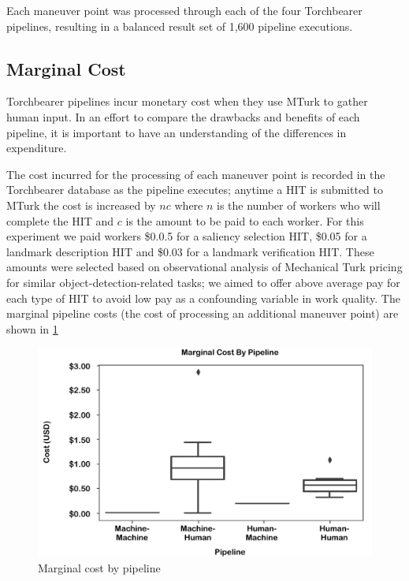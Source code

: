 Each maneuver point was processed through each of the four Torchbearer pipelines, resulting in a balanced result set of 1,600 pipeline executions.

\subsection{Marginal Cost}

Torchbearer pipelines incur monetary cost when they use MTurk to gather human input. In an effort to compare the drawbacks and benefits of each pipeline, it is important to have an understanding of the differences in expenditure.

The cost incurred for the processing of each maneuver point is recorded in the Torchbearer database as the pipeline executes; anytime a HIT is submitted to MTurk the cost is increased by $nc$ where $n$ is the number of workers who will complete the HIT and $c$ is the amount to be paid to each worker. For this experiment we paid workers \$0.0.5 for a saliency selection HIT, \$0.05 for a landmark description HIT and \$0.03 for a landmark verification HIT. These amounts were selected based on observational analysis of Mechanical Turk pricing for similar object-detection-related tasks; we aimed to offer above average pay for each type of HIT to avoid low pay as a confounding variable in work quality. The marginal pipeline costs (the cost of processing an additional maneuver point) are shown in \ref{fig:plot:cost}

\begin{figure}[htbp]
  \centering
  \includegraphics[width=\textwidth]{images/plot_cost.pdf}
  \caption{Marginal cost by pipeline}
  \label{fig:plot:cost}
\end{figure}

